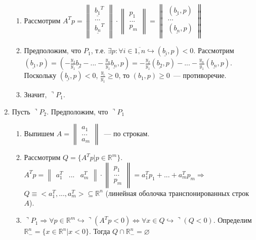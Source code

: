 \documentclass[a4paper]{article}
\newcommand{\RR}{\mathbb{R}}
\begin{document}
\begin{enumerate}
\begin{enumerate}
\item Рассмотрим $A^Tp=\begin{Vmatrix}
\underline{b_1}^T\\
...\\
\underline{b_n}^T\\
\end{Vmatrix}\cdot\begin{Vmatrix}
p_1\\
...\\
p_m
\end{Vmatrix}=\begin{Vmatrix}
(\underline{b_1},p)\\
...\\
(\underline{b_n},p)\\
\end{Vmatrix}$
\item Предположим, что $P_1$, т.е. $\exists p\colon\forall i\in\overline{1,n}\hookrightarrow (\underline{b_i},p)<0$.\newline
Рассмотрим $(\underline{b_1},p)=(-\frac{y_2}{y_1}\underline{b_2}-...-\frac{y_n}{y_1}\underline{b_n},p)=-\frac{y_2}{y_1}(\underline{b_2},p)-...-\frac{y_n}{y_1}(\underline{b_n},p)$. Поскольку $(\underline{b_i},p)<0$, $\frac{y_i}{y_1}\geqslant 0$, то $(b_1,p)\geqslant 0$~--- противоречие.
\item Значит, $\urcorner P_1$.
\end{enumerate}
\item Пусть $\urcorner P_2$. Предположим, что $\urcorner P_1$\begin{enumerate}
\item Выпишем $A=\begin{Vmatrix}
a_1\\
...\\
a_m
\end{Vmatrix}$~--- по строкам.
\item Рассмотрим $Q=\{A^Tp\big|p\in\RR^m\}$. $A^Tp=\begin{Vmatrix}
a_1^T & ... & a_m^T
\end{Vmatrix}\cdot\begin{Vmatrix}
p_1\\
...\\
p_m
\end{Vmatrix}=a_1^Tp_1+...+a_m^Tp_m\Rightarrow$\newline $Q\equiv <a_1^T,...,a_m^T>\subseteq\RR^n$ (линейная оболочка транспонированных строк $A$).
\item $\urcorner P_1\Rightarrow \forall p\in\RR^m\hookrightarrow \urcorner(A^Tp<0)\Leftrightarrow \forall x\in Q\hookrightarrow \urcorner(Q<0)$. Определим $\RR^n_{-}=\{x\in\RR^n\big|x<0\}$. Тогда $Q\cap \RR^n_-=\varnothing$

\end{enumerate}
\end{enumerate}
\end{document}
